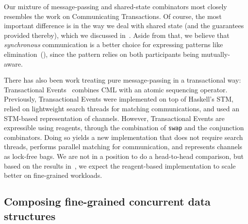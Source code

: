 \documentclass[preprint]{sigplanconf}
\begin{document}
Our mixture of message-passing and shared-state combinators most closely
resembles the work on Communicating Transactions.  Of course, the most
important difference is in the way we deal with shared state (and the
guarantees provided thereby), which we discussed in~.  Aside from
that, we believe that \emph{synchronous} communication is a better choice for
expressing patterns like elimination~(), since the pattern
relies on both participants being mutually-aware.  %


There has also been work treating pure message-passing in a transactional way:
Transactional Events~\cite{Donnelly2006} combines CML with an atomic
sequencing operator.  Previously, Transactional Events were implemented on top
of Haskell's STM, relied on lightweight search threads for matching
communications, and used an STM-based representation of channels.  However,
Transactional Events are expressible using reagents, through the combination
of \lstinline{swap} and the conjunction combinators.  Doing so yields a new
implementation that does not require search threads, performs parallel
matching for communication, and represents channels as lock-free bags.  We are
not in a position to do a head-to-head comparison, but based on the results
in~, we expect the reagent-based implementation to scale
better on fine-grained workloads.

\subsection{Composing fine-grained concurrent data structures}
\end{document}
